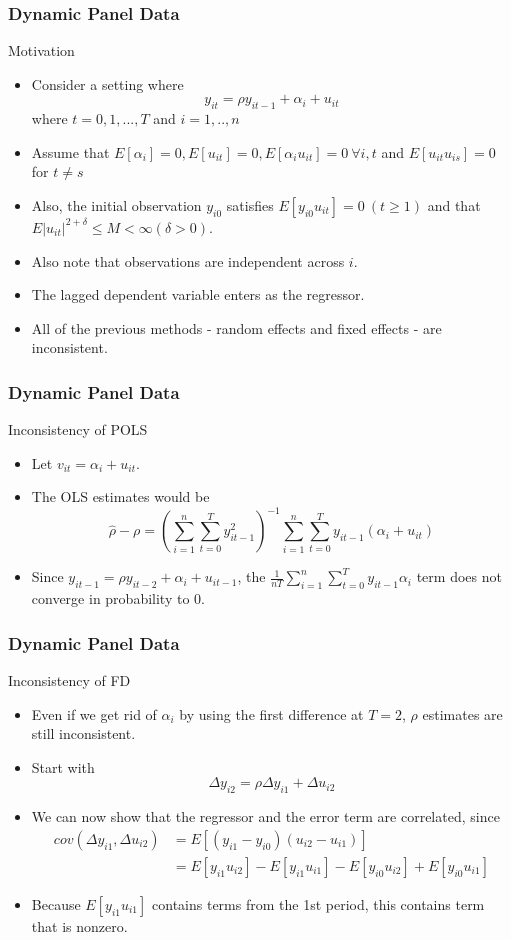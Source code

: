 \documentclass{beamer}
\begin{document}
\begin{frame}
\frametitle{Dynamic Panel Data}
Motivation
\begin{itemize}
\item Consider a setting where
\[
y_{it}=\rho y_{it-1}+\alpha_i +u_{it}
\]
where $t=0,1,...,T$ and $i=1,..,n$
\item Assume that $E[\alpha_i]=0, E[u_{it}]=0, E[\alpha_i u_{it}]=0 \ \forall i,t$ and $E[u_{it}u_{is}]=0$ for $t\neq s$
\item Also, the initial observation $y_{i0}$ satisfies $E[y_{i0}u_{it}]=0\ (t\geq1)$ and that $E|u_{it}|^{2+\delta}\leq M <\infty (\delta>0)$. \item Also note that observations are independent across $i$.
\item The lagged dependent variable enters as the regressor.
\item All of the previous methods - random effects and fixed effects - are inconsistent. 
\end{itemize}
\end{frame}

\begin{frame}
\frametitle{Dynamic Panel Data}
Inconsistency of POLS
\begin{itemize}
\item Let $v_{it}=\alpha_i + u_{it}$. 
\item The OLS estimates would be
\[
\hat{\rho}-\rho = \left(\sum_{i=1}^n \sum_{t=0}^Ty_{it-1}^2 \right)^{-1}\sum_{i=1}^n \sum_{t=0}^Ty_{it-1}(\alpha_i + u_{it})
\]
\item Since $y_{it-1}= \rho y_{it-2}+\alpha_i + u_{it-1}$, the $\frac{1}{nT}\sum_{i=1}^n \sum_{t=0}^Ty_{it-1}\alpha_i$ term does not converge in probability to 0.
\end{itemize}
\end{frame}

\begin{frame}
\frametitle{Dynamic Panel Data}
Inconsistency of FD
\begin{itemize}
\item Even if we get rid of $\alpha_i$ by using the first difference at $T=2$, $\rho$ estimates are still inconsistent.
\item Start with
\[
\Delta y_{i2}=\rho\Delta y_{i1}+\Delta u_{i2}
\]
\item We can now show that the regressor and the error term are correlated, since
\begin{align*}
cov(\Delta y_{i1}, \Delta u_{i2})&=E[(y_{i1}-y_{i0})(u_{i2}-u_{i1})]\\
 &=E[y_{i1}u_{i2}]-E[y_{i1}u_{i1}]-E[y_{i0}u_{i2}]+E[y_{i0}u_{i1}]
\end{align*}
\item Because $E[y_{i1}u_{i1}]$ contains terms from the 1st period, this contains term that is nonzero.
\end{itemize}
\end{frame}
\end{document}
